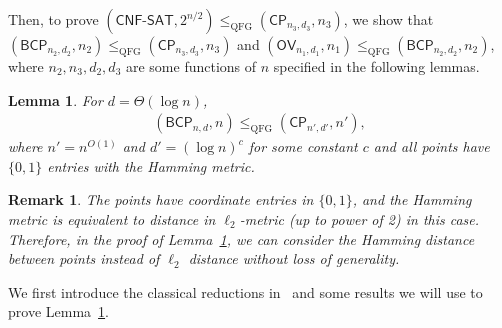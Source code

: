 \documentclass[10pt,a4paper]{article}
\newtheorem{lemma}[theorem]{Lemma}
\newtheorem{remark}[theorem]{Remark}
\newcommand{\QFG}{\mathrm{QFG}}
\newcommand{\CP}{\ensuremath{\mathsf{CP}}}
\newcommand{\BCP}{\ensuremath{\mathsf{BCP}}}
\begin{document}
Then, to prove $(\textsf{CNF-SAT}, 2^{n/2})\leq_{\QFG} (\textsf{CP}_{n_3,d_3}, n_3)$, we show that $(\textsf{BCP}_{n_2,d_2},n_2)\leq_{\QFG} (\CP_{n_3,d_3},n_3)$ and $(\textsf{OV}_{n_1,d_1}, n_1) \leq_{\QFG} (\textsf{BCP}_{n_2,d_2},n_2)$, where $n_2, n_3, d_2,d_3$ are some functions of $n$ specified in the following lemmas.

\begin{lemma}\label{lem:qbcp_to_cp}
For $d=\Theta(\log n)$,
\begin{align}
    (\BCP_{n,d},n)\leq_{\QFG} (\CP_{n',d'},n'),
\end{align}
where $n' = n^{O(1)}$ and $d'=(\log n)^{c}$ for some constant $c$ and all points have $\{0,1\}$ entries with the Hamming metric.
\end{lemma}

\begin{remark}
The points have coordinate entries in $\{0,1\}$, and the Hamming metric is equivalent to distance in $\ell_2$-metric (up to power of 2) in this case. Therefore, in the proof of Lemma~\ref{lem:qbcp_to_cp}, we can consider the Hamming distance between points instead of $\ell_2$ distance without loss of generality. 
\end{remark}

We first introduce the classical reductions in~\cite{r29} and some results we will use to prove Lemma~\ref{lem:qbcp_to_cp}. 
\end{document}
